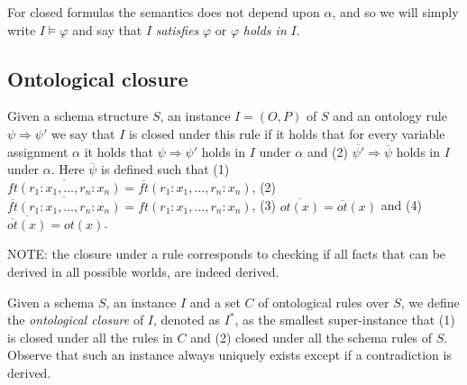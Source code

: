 \documentclass[11pt]{amsart}
\newcommand{\decl}[1]{{#1}^{\textrm{\textbf{decl}}}}
\begin{document}
For closed formulas the semantics does not depend upon $\alpha$, and so we will simply write $I \models \varphi$ and say that $I$ \emph{satisfies} $\varphi$ or $\varphi$ \emph{holds in} $I$.

%

\subsection{Ontological closure} Given a schema structure $S$, an instance $I = (O, P)$ of $S$ and an ontology rule $\psi \Rightarrow \psi'$ we say that $I$ is closed under this rule if it holds that for every variable assignment $\alpha$ it holds that $\psi \Rightarrow \psi'$ holds in $I$ under $\alpha$ and (2) $\overline{\psi'} \Rightarrow \overline{\psi}$ holds in $I$ under $\alpha$. Here $\overline{\psi}$ is defined such that (1) $\overline{{ft}(r_1:x_1, \ldots, r_n:x_n)} = \overline{ft}(r_1:x_1, \ldots, r_n:x_n)$, (2) $\overline{\overline{ft}(r_1:x_1, \ldots, r_n:x_n)} = {ft}(r_1:x_1, \ldots, r_n:x_n)$, (3) $\overline{{ot}(x)} = \overline{ot}(x)$ and (4)  $\overline{\overline{ot}(x)} = {ot}(x)$.  

NOTE: the closure under a rule corresponds to checking if all facts that can be derived in all possible worlds, are indeed derived.

Given a schema $S$, an instance $I$ and a set $C$ of ontological rules over $S$, we define the \emph{ontological closure} of $I$, denoted as $I^*$, as the smallest super-instance that (1) is closed under all the rules in $C$ and (2) closed under all the schema rules of $S$. Observe that such an instance always uniquely exists except if a contradiction is derived.
\end{document}
